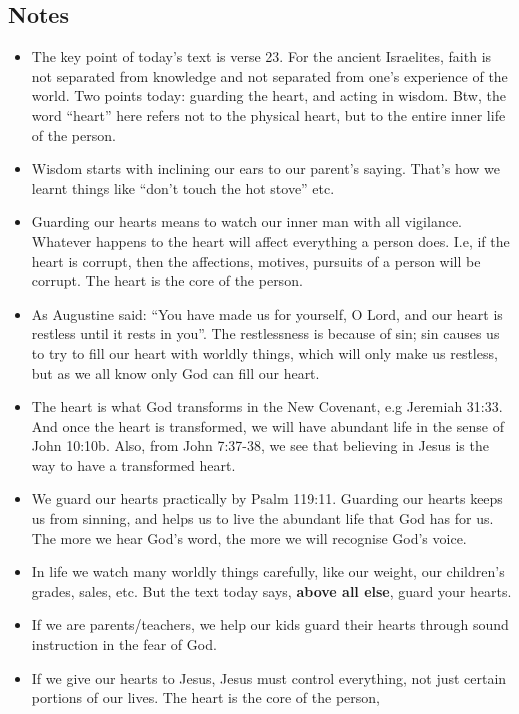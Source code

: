 \subsection*{Notes}
\begin{itemize}
  \item{The key point of today's text is verse 23.  For the ancient
  Israelites, faith is not separated from knowledge and not separated from
  one's experience of the world.  Two points today: guarding the heart, and
  acting in wisdom.  Btw, the word ``heart'' here refers not to the physical
  heart, but to the entire inner life of the person.}
  \item{Wisdom starts with inclining our ears to our parent's saying.  That's
  how we learnt things like ``don't touch the hot stove'' etc.}
  \item{Guarding our hearts means to watch our inner man with all vigilance.
  Whatever happens to the heart will affect everything a person does.  I.e,
  if the heart is corrupt, then the affections, motives, pursuits of a person
  will be corrupt. The heart is the core of the person.}
  \item{As Augustine said: ``You have made us for yourself, O Lord, and our
  heart is restless until it rests in you''.  The restlessness is because of
  sin; sin causes us to try to fill our heart with worldly things, which will
  only make us restless, but as we all know only God can fill our heart.}
  \item{The heart is what God transforms in the New Covenant, e.g Jeremiah
  31:33.  And once the heart is transformed, we will have abundant life in
  the sense of John 10:10b.  Also, from John 7:37-38, we see that believing
  in Jesus is the way to have a transformed heart.}
  \item{We guard our hearts practically by Psalm 119:11.  Guarding our hearts
  keeps us from sinning, and helps us to live the abundant life that God has
  for us.  The more we hear God's word, the more we will recognise God's
  voice.}
  \item{In life we watch many worldly things carefully, like our weight, our
  children's grades, sales, etc.  But the text today says, \textbf{above all
  else}, guard your hearts.}
  \item{If we are parents/teachers, we help our kids guard their hearts
  through sound instruction in the fear of God.}
  \item{If we give our hearts to Jesus, Jesus must control everything, not
  just certain portions of our lives.  The heart is the core of the person,
}
\end{itemize}
